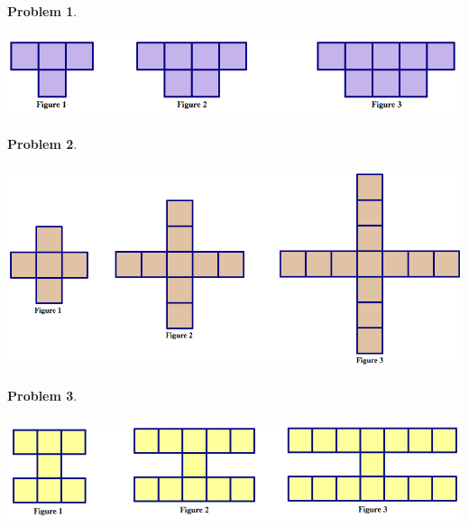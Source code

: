 \documentclass[12pt, reqno]{amsart}
\theoremstyle{remark}
\theoremstyle{definition}
\newtheorem{problem}{Problem}
\numberwithin{equation}{section}  %
\begin{document}
\bigskip


\begin{problem}\ 

\begin{center}
\includegraphics[height=2.5cm]{pattern3}
\end{center}

\end{problem}

\newpage

\begin{problem}\ 

\begin{center}
\includegraphics[height=6cm]{pattern4}
\end{center}

\end{problem}

\bigskip


\begin{problem}\ 

\begin{center}
\includegraphics[height=3.25cm]{pattern5}
\end{center}

\end{problem}



\bigskip
\end{document}
